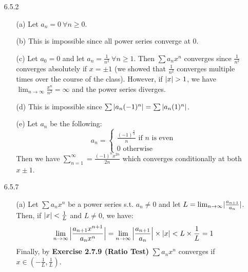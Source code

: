 \documentclass[11pt]{article}
\DeclarePairedDelimiter\abs{\lvert}{\rvert}%
\DeclarePairedDelimiter\absb{\Big\lvert}{\Big\rvert}%
\begin{document}
\begin{itemize}
    \item[6.5.2]
        \begin{itemize}
            \item[(a)]
                Let $a_n = 0\ \forall n \geq 0$.

            \item[(b)]
                This is impossible since all power series converge at $0$.

            \item[(c)]
                Let $a_0 = 0$ and let $a_n = \frac{1}{n^2}\ \forall n \geq 1$.
                Then $\sum a_nx^n$ converges since $\frac{1}{n^2}$ converges
                absolutely if $x = \pm 1$ (we showed that $\frac{1}{n^2}$
                converges multiple times over the course of the class).
                However, if $\abs{x} > 1$, we have $\lim_{n \to \infty}
                \frac{x^n}{n^2} = \infty$ and the power series diverges.

            \item[(d)]
                This is impossible since $\sum{\abs{a_n(-1)^n}} =
                \sum{\abs{a_n(1)^n}}$.

            \item[(e)]
                Let $a_n$ be the following:
                \begin{equation*}
                    a_n =
                    \begin{cases}
                        \frac{(-1)^{\frac{n}{2}}}{n} \text{ if $n$ is even}\\
                        0 \text{ otherwise}
                    \end{cases}
                \end{equation*}
                Then we have $\sum_{n = 1}^\infty = \frac{(-1)^nx^{2n}}{2n}$
                which converges conditionally at both $x \pm 1$.
        \end{itemize}

    \item[6.5.7]
        \begin{itemize}
            \item[(a)]
                Let $\sum a_nx^n$ be a power series s.t. $a_n \neq 0$ and let
                $L = \lim_{n \to \infty}\abs{{\frac{a_{n + 1}}{a_n}}}$. Then,
                if $\abs{x} < \frac{1}{L}$ and $L \neq 0$, we have:
                \begin{equation*}
                    \lim_{n \to \infty}{\absb{\frac{a_{n + 1}x^{n + 1}}{a_nx^n}}}
                        = \lim_{n \to \infty}{\absb{\frac{a_{n + 1}}{a_n}} \times \abs{x}}
                        < L \times \frac{1}{L} = 1
                \end{equation*}
                Finally, by \textbf{Exercise 2.7.9 (Ratio Test)} $\sum a_nx^n$
                converges if $x \in (-\frac{1}{L}, \frac{1}{L})$.


\end{itemize}
\end{itemize}
\end{document}

